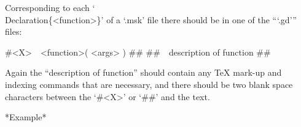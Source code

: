 Corresponding to each  `\\Declaration\{<function>\}'  of  a  `.msk'  file
there should be in one of the ```.gd''' files:

\)\#<X>\ \ <function>( <args> )
\)\#\#
\)\#\#\ \ description of function
\)\#\#

Again the ``description of function'' should contain any  {\TeX}  mark-up
and indexing commands that are necessary, and there should be  two  blank
space characters between the `\#<X>' or `\#\#' and the text.

*Example*


